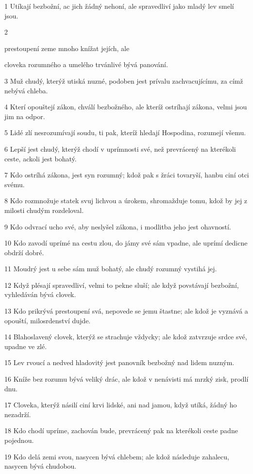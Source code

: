 \par 1 Utíkají bezbožní, ac jich žádný nehoní, ale spravedliví jako mladý lev smelí jsou.
\par 2 \par prestoupení zeme mnoho knížat jejích, ale \par cloveka rozumného a umelého trvánlivé bývá panování.
\par 3 Muž chudý, kterýž utiská nuzné, podoben jest prívalu zachvacujícímu, za címž nebývá chleba.
\par 4 Kterí opouštejí zákon, chválí bezbožného, ale kteríž ostríhají zákona, velmi jsou jim na odpor.
\par 5 Lidé zlí nesrozumívají soudu, ti pak, kteríž hledají Hospodina, rozumejí všemu.
\par 6 Lepší jest chudý, kterýž chodí v uprímnosti své, než prevrácený na kterékoli ceste, ackoli jest bohatý.
\par 7 Kdo ostríhá zákona, jest syn rozumný; kdož pak s žráci tovaryší, hanbu ciní otci svému.
\par 8 Kdo rozmnožuje statek svuj lichvou a úrokem, shromažduje tomu, kdož by jej z milosti chudým rozdeloval.
\par 9 Kdo odvrací ucho své, aby neslyšel zákona, i modlitba jeho jest ohavností.
\par 10 Kdo zavodí uprímé na cestu zlou, do jámy své sám vpadne, ale uprímí dedicne obdrží dobré.
\par 11 Moudrý jest u sebe sám muž bohatý, ale chudý rozumný vystihá jej.
\par 12 Když plésají spravedliví, velmi to pekne sluší; ale když povstávají bezbožní, vyhledáván bývá clovek.
\par 13 Kdo prikrývá prestoupení svá, nepovede se jemu štastne; ale kdož je vyznává a opouští, milosrdenství dujde.
\par 14 Blahoslavený clovek, kterýž se strachuje vždycky; ale kdož zatvrzuje srdce své, upadne ve zlé.
\par 15 Lev rvoucí a nedved hladovitý jest panovník bezbožný nad lidem nuzným.
\par 16 Kníže bez rozumu bývá veliký drác, ale kdož v nenávisti má mrzký zisk, prodlí dnu.
\par 17 Cloveka, kterýž násilí ciní krvi lidské, ani nad jamou, když utíká, žádný ho nezadrží.
\par 18 Kdo chodí upríme, zachován bude, prevrácený pak na kterékoli ceste padne pojednou.
\par 19 Kdo delá zemi svou, nasycen bývá chlebem; ale kdož následuje zahalecu, nasycen bývá chudobou.
